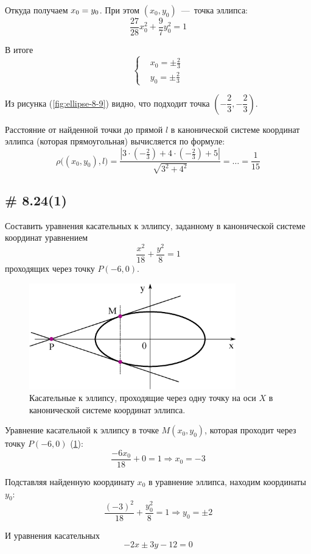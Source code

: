 \documentclass[a4paper,12pt]{article}
\begin{document}
\begin{solution}
    Откуда получаем
    $
      x_0 \hm= y_0
    $.
    При этом $(x_0, y_0)$~---~точка эллипса:
    \[
      \frac{27}{28} x_0^2 + \frac{9}{7} y_0^2 = 1
    \]
    
    В итоге
    \[
      \left\{
        \begin{aligned}
          &x_0 = \pm \frac{2}{3}\\
          &y_0 = \pm \frac{2}{3}
        \end{aligned}
      \right.
    \]
    
    Из рисунка (\ref{fig:ellipse-8-9}) видно, что подходит точка $\left(-\dfrac{2}{3}, -\dfrac{2}{3}\right)$.
    
    Расстояние от найденной точки до прямой $l$ в канонической системе координат эллипса (которая прямоугольная) вычисляется по формуле:
    \[
      \rho{\bigl((x_0, y_0), l\bigr)} = \frac{\left|3 \cdot \left(-\frac{2}{3}\right) + 4 \cdot \left(-\frac{2}{3}\right) + 5\right|}{\sqrt{3^2 + 4^2}} = \ldots = \frac{1}{15}
    \]
  \end{solution}
  
  
  \subsection{\# 8.24(1)}
  
  Составить уравнения касательных к эллипсу, заданному в канонической системе координат уравнением
  \[
    \frac{x^2}{18} + \frac{y^2}{8} = 1
  \]
  проходящих через точку $P(-6, 0)$.
  
  \begin{solution}
    \begin{figure}[h]
      \centering

      \includegraphics[width=0.8\textwidth]{ellipse-8-24}
    
      \caption{Касательные к эллипсу, проходящие через одну точку на оси $X$ в канонической системе координат эллипса.}
      \label{fig:ellipse-8-24}
    \end{figure}
    
    Уравнение касательной к эллипсу в точке $M(x_0, y_0)$, которая проходит через точку $P(-6, 0)$ (\ref{fig:ellipse-8-24}):
    \[
      \frac{-6 x_0}{18} + 0 = 1 \Rightarrow x_0 = -3
    \]
    
    Подставляя найденную координату $x_0$ в уравнение эллипса, находим координаты $y_0$:
    \[
      \frac{(-3)^2}{18} + \frac{y_0^2}{8} = 1 \Rightarrow y_0 = \pm 2
    \]
    
    И уравнения касательных
    \[
      -2x \pm 3y - 12 = 0
    \]
  \end{solution}
  
\end{document}
